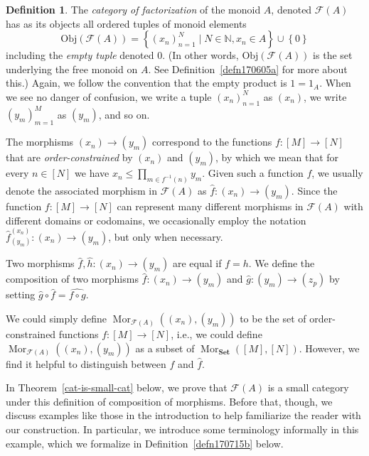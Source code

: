 \documentclass[reqno]{amsart}
\theoremstyle{plain}
\theoremstyle{definition}
\newtheorem{defn}[lem]{Definition}
\newcommand{\cat}[1]{\mathcal{#1}}
\newcommand{\catf}{\cat{F}}
\newcommand{\bbn}{\mathbb{N}}
\newcommand{\emptytuple}{\mathfrak{0}}
\renewcommand{\leq}{\leqslant}
\newcommand{\mor}[3]{\operatorname{Mor}_{#1}(#2,#3)}
\newcommand{\catset}{\mathbf{Set}}
\numberwithin{equation}{lem}
\begin{document}
\begin{defn}\label{defn180217a}
The \textit{category of factorization} of the monoid $A$, denoted $\mathcal{F}(A)$ has 
as its objects
all ordered tuples of monoid elements
\[\text{Obj}(\mathcal{F}(A)) = \left\{(x_n)_{n=1}^{N} \mid N \in \bbn, x_n \in A\right\} \cup \left\{\emptytuple\right\}\] 
including the \emph{empty tuple} denoted $\emptytuple$.
(In other words, $\text{Obj}(\mathcal{F}(A))$ is the set underlying the free monoid on $A$. See Definition~\ref{defn170605a} for more
about this.)
Again, we follow the convention that the empty product is $1=1_A$.
When we see no danger of confusion, we write a tuple $(x_n)_{n=1}^{N}$ as $(x_n)$, we write $(y_m)_{m=1}^{M}$ as $(y_m)$,
and so on. 

The morphisms $(x_n)\to(y_m)$ correspond to the functions $f\colon[M]\to[N]$ that
are \emph{order-constrained} by  $(x_n)$ and $(y_m)$, by which we mean that
for every $n\in[N]$ we have $x_n \leq \prod_{m \in f^{-1}(n)} y_m$. 
Given such a function $f$, we usually denote the associated morphism in $\mathcal F(A)$ as
$\hat f\colon (x_n)\to(y_m)$.
Since the function $f\colon[M]\to[N]$ can represent many different morphisms
in $\catf(A)$ with different domains or codomains, we occasionally employ the notation
$\hat f^{(x_n)}_{(y_m)}\colon (x_n)\to(y_m)$, but only when necessary.

Two morphisms $\hat f,\hat h\colon (x_n)\to(y_m)$ are equal if $f=h$. We
define the composition of two morphisms $\hat{f} \colon(x_n)\to (y_m)$ 
and $\hat{g} 
\colon (y_m)\to (z_p)$ by setting $\hat{g}\circ \hat{f} = \widehat{f \circ g}$. 
\label{cat-defined}
\end{defn}

We could simply define
$\mor{\catf(A)}{(x_n)}{(y_m)}$
to be
the set of 
order-constrained
functions $f\colon [M]\to[N]$,
i.e.,
we could define
$\mor{\catf(A)}{(x_n)}{(y_m)}$
as a subset of $\mor{\catset}{[M]}{[N]}$.
However, we find it helpful to distinguish between $f$ and $\hat f$.

In Theorem~\ref{cat-is-small-cat} below, 
we prove that $\mathcal{F}(A)$ is a 
small
category under this definition of composition of morphisms.
Before that, though, we discuss examples like those in the introduction to help familiarize the reader with our construction.
In particular, we introduce some terminology informally in this example, which we formalize in Definition~\ref{defn170715b} below.
\end{document}
